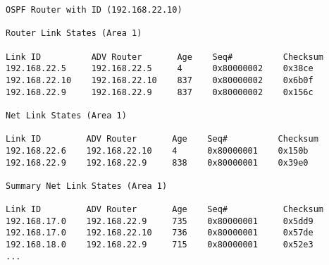 \documentclass[documentation]{subfiles}
\begin{document}
\begin{lstlisting}
OSPF Router with ID (192.168.22.10)

Router Link States (Area 1)

Link ID          ADV Router       Age    Seq#          Checksum
192.168.22.5     192.168.22.5     4      0x80000002    0x38ce
192.168.22.10    192.168.22.10    837    0x80000002    0x6b0f
192.168.22.9     192.168.22.9     837    0x80000002    0x156c

Net Link States (Area 1)

Link ID         ADV Router       Age    Seq#          Checksum
192.168.22.6    192.168.22.10    4      0x80000001    0x150b
192.168.22.9    192.168.22.9     838    0x80000001    0x39e0

Summary Net Link States (Area 1)

Link ID         ADV Router       Age    Seq#           Checksum
192.168.17.0    192.168.22.9     735    0x80000001     0x5dd9
192.168.17.0    192.168.22.10    736    0x80000001     0x57de
192.168.18.0    192.168.22.9     715    0x80000001     0x52e3
...
\end{lstlisting}
\end{document}
